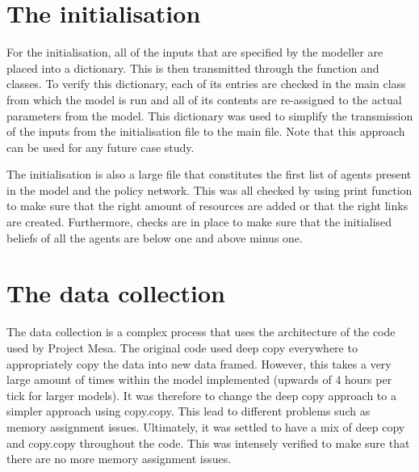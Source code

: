 \section{The initialisation}

For the initialisation, all of the inputs that are specified by the modeller are placed into a dictionary. This is then transmitted through the function and classes. To verify this dictionary, each of its entries are checked in the main class from which the model is run and all of its contents are re-assigned to the actual parameters from the model. This dictionary was used to simplify the transmission of the inputs from the initialisation file to the main file. Note that this approach can be used for any future case study.

The initialisation is also a large file that constitutes the first list of agents present in the model and the policy network. This was all checked by using print function to make sure that the right amount of resources are added or that the right links are created. Furthermore, checks are in place to make sure that the initialised beliefs of all the agents are below one and above minus one.

\section{The data collection}

The data collection is a complex process that uses the architecture of the code used by Project Mesa. The original code used deep copy everywhere to appropriately copy the data into new data framed. However, this takes a very large amount of times within the model implemented (upwards of 4 hours per tick for larger models). It was therefore to change the deep copy approach to a simpler approach using copy.copy. This lead to different problems such as memory assignment issues. Ultimately, it was settled to have a mix of deep copy and copy.copy throughout the code. This was intensely verified to make sure that there are no more memory assignment issues.








